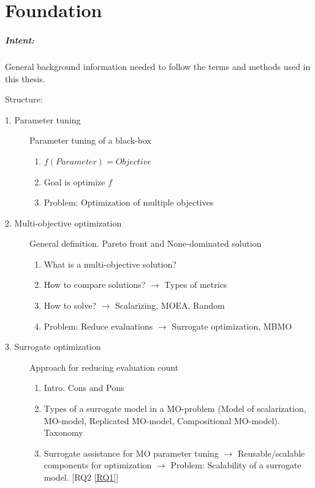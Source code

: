 \chapter{Foundation}\label{sec:foundation}

    \begin{blockquote}
        \paragraph{Intent:} General background information needed to follow the terms and methods used in this thesis.
        
        Structure:
        \begin{description}
            \item[1. Parameter tuning] Parameter tuning of a black-box
                \begin{enumerate}
                    \item $f(Parameter) = Objective$ 
                    \item Goal is optimize $f$
                    \item Problem: Optimization of multiple objectives
                \end{enumerate}
            \item[2. Multi-objective optimization] General definition. Pareto front and None-dominated solution
                \begin{enumerate}
                    \item What is a multi-objective solution?
                    \item How to compare solutions? $\rightarrow$ Types of metrics
                    \item How to solve? $\rightarrow$ Scalarizing, MOEA, Random
                    \item Problem: Reduce evaluations $\rightarrow$ Surrogate optimization, MBMO
                \end{enumerate}
            \item[3. Surrogate optimization] Approach for reducing evaluation count
                \begin{enumerate}
                    \item Intro. Cons and Pons
                    \item Types of a surrogate model in a MO-problem (Model of scalarization, MO-model, Replicated MO-model, Compositional MO-model). Taxonomy
                    \item Surrogate assistance for MO parameter tuning $\rightarrow$ Reusable/scalable components for optimization $\rightarrow$ Problem: Scalability of a surrogate model. [RQ2 \ref{RQ1}]                   

\end{enumerate}
\end{description}
\end{blockquote}
